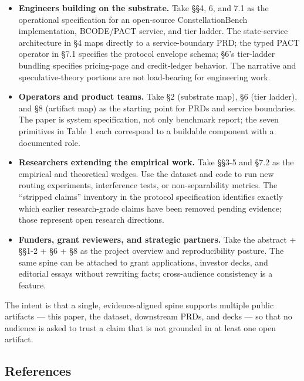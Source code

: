 \begin{itemize}
\tightlist
\item
  \textbf{Engineers building on the substrate.} Take §§4, 6, and 7.1 as
  the operational specification for an open-source ConstellationBench
  implementation, BCODE/PACT service, and tier ladder. The state-service
  architecture in §4 maps directly to a service-boundary PRD; the typed
  PACT operator in §7.1 specifies the protocol envelope schema; §6's
  tier-ladder bundling specifies pricing-page and credit-ledger
  behavior. The narrative and speculative-theory portions are not
  load-bearing for engineering work.
\item
  \textbf{Operators and product teams.} Take §2 (substrate map), §6
  (tier ladder), and §8 (artifact map) as the starting point for PRDs
  and service boundaries. The paper is system specification, not only
  benchmark report; the seven primitives in Table 1 each correspond to a
  buildable component with a documented role.
\item
  \textbf{Researchers extending the empirical work.} Take §§3-5 and §7.2
  as the empirical and theoretical wedges. Use the dataset and code to
  run new routing experiments, interference tests, or non-separability
  metrics. The ``stripped claims'' inventory in the protocol
  specification identifies exactly which earlier research-grade claims
  have been removed pending evidence; those represent open research
  directions.
\item
  \textbf{Funders, grant reviewers, and strategic partners.} Take the
  abstract + §§1-2 + §6 + §8 as the project overview and reproducibility
  posture. The same spine can be attached to grant applications,
  investor decks, and editorial essays without rewriting facts;
  cross-audience consistency is a feature.
\end{itemize}

The intent is that a single, evidence-aligned spine supports multiple
public artifacts --- this paper, the dataset, downstream PRDs, and decks
--- so that no audience is asked to trust a claim that is not grounded
in at least one open artifact.

\subsection{References}\label{references}

